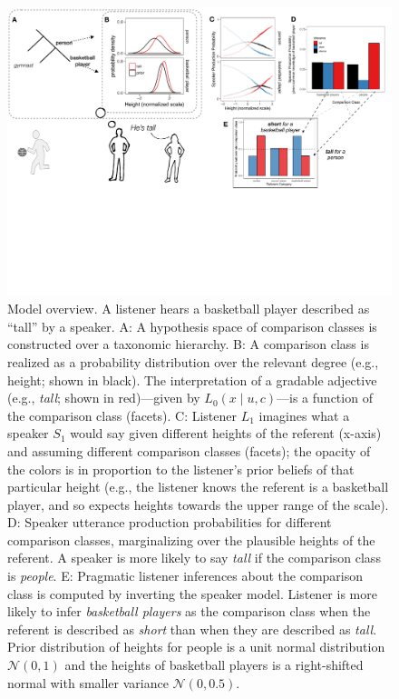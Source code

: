 \documentclass[doc]{apa6}
\begin{document}
  
\begin{figure}[ht]
\centering
\includegraphics[width=\textwidth]{figs/model_cartoon.pdf}
\caption{\small \label{fig:modelCartoon}Model overview. A listener hears a basketball player described as ``tall'' by a speaker. A: A hypothesis space of comparison classes is constructed over a taxonomic hierarchy. B: A comparison class is realized as a probability distribution over the relevant degree (e.g., height; shown in black). The interpretation of a gradable adjective (e.g., \emph{tall}; shown in red)---given by $L_{0}(x \mid u, c)$---is a function of the comparison class (facets). C: Listener $L_1$ imagines what a speaker $S_1$ would say given different heights of the referent (x-axis) and assuming different comparison classes (facets); the opacity of the colors is in proportion to the listener's prior beliefs of that particular height (e.g., the listener knows the referent is a basketball player, and so expects heights towards the upper range of the scale). D: Speaker utterance production probabilities for different comparison classes, marginalizing over the plausible heights of the referent. A speaker is more likely to say \emph{tall} if the comparison class is \emph{people}. E: Pragmatic listener inferences about the comparison class is computed by inverting the speaker model. Listener is more likely to infer \emph{basketball players} as the comparison class when the referent is described as \emph{short} than when they are described as \emph{tall}. Prior distribution of heights for people is a unit normal distribution $\mathcal{N}(0, 1)$ and the heights of basketball players is a right-shifted normal with smaller variance $\mathcal{N}(0, 0.5)$.
}
\end{figure}
  
\end{document}
